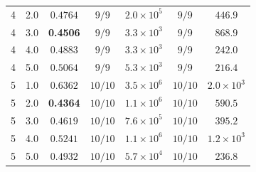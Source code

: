\begin{tabular}{cc c cc cc}
4 & 2.0 & $0.4764$ & $9/9$ & $2.0 \times 10^{5}$ & $9/9$ & $446.9$ \\
4 & 3.0 & \textbf{0.4506} & $9/9$ & $3.3 \times 10^{3}$ & $9/9$ & $868.9$ \\
4 & 4.0 & $0.4883$ & $9/9$ & $3.3 \times 10^{3}$ & $9/9$ & $242.0$ \\
4 & 5.0 & $0.5064$ & $9/9$ & $5.3 \times 10^{3}$ & $9/9$ & $216.4$ \\
5 & 1.0 & $0.6362$ & $10/10$ & $3.5 \times 10^{6}$ & $10/10$ & $2.0 \times 10^{3}$ \\
5 & 2.0 & \textbf{0.4364} & $10/10$ & $1.1 \times 10^{6}$ & $10/10$ & $590.5$ \\
5 & 3.0 & $0.4619$ & $10/10$ & $7.6 \times 10^{5}$ & $10/10$ & $395.2$ \\
5 & 4.0 & $0.5241$ & $10/10$ & $1.1 \times 10^{6}$ & $10/10$ & $1.2 \times 10^{3}$ \\
5 & 5.0 & $0.4932$ & $10/10$ & $5.7 \times 10^{4}$ & $10/10$ & $236.8$ \\
\bottomrule
\end{tabular}
